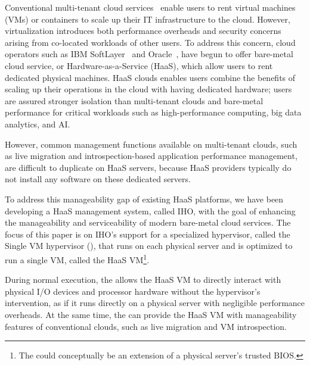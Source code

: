 Conventional multi-tenant cloud services~\cite{ec2,azure,gcp} enable
users to rent virtual machines (VMs) or containers to scale 
up their IT infrastructure to the cloud. However, virtualization
introduces both performance overheads and security concerns
arising from co-located workloads of other users.
To address this concern, cloud operators 
such as  IBM SoftLayer~\cite{softlayer} and Oracle~\cite{oracle},
have begun to offer bare-metal cloud service, or Hardware-as-a-Service (HaaS),
which allow users to rent dedicated  physical machines.
HaaS clouds enables users combine the benefits of 
scaling up their operations in the cloud with having dedicated 
hardware; users are assured stronger isolation than multi-tenant clouds and 
bare-metal performance for critical workloads 
such as high-performance computing, big data analytics, and AI.

However, common management functions available on multi-tenant clouds,
such as live migration and introspection-based 
application performance management, are difficult to 
duplicate on HaaS servers, because HaaS providers typically 
do not install any software on these dedicated servers.

To address this manageability gap of existing HaaS platforms, 
we have been developing a HaaS management system, called 
IHO,
with the goal of enhancing the manageability and serviceability 
of modern bare-metal cloud services.
The focus of this paper is on IHO's support for a 
specialized hypervisor, called the Single VM
hypervisor (\sna), that runs on each physical server and is optimized to run a single VM, called the 
HaaS VM\footnote{The \na could conceptually be an extension of a physical server's trusted BIOS.}.

During normal execution, the \na allows 
the HaaS VM to directly interact with physical I/O devices and processor hardware
without the hypervisor's intervention, 
as if it runs directly on a physical server with negligible performance overheads.
At the same time, the \na can provide the HaaS VM with 
manageability features of conventional clouds, such as 
live migration and VM introspection.

